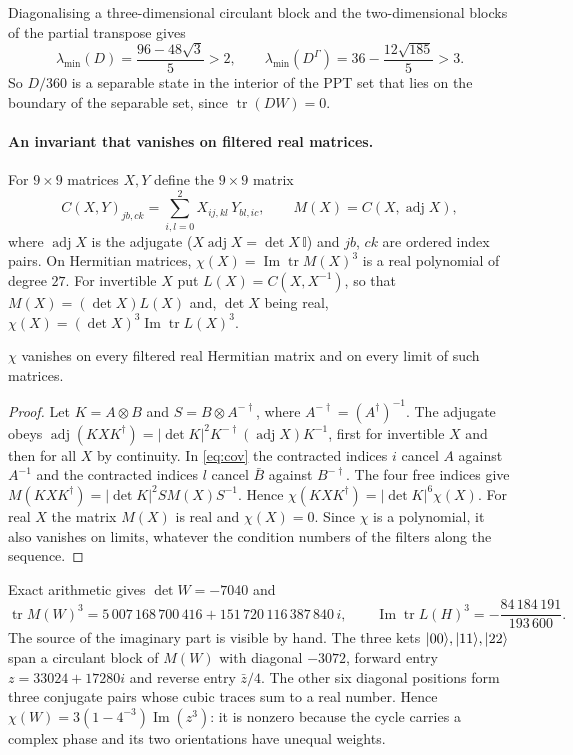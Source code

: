\documentclass[11pt,a4paper]{article}
\theoremstyle{definition}\newtheorem{definition}[theorem]{Definition}\newtheorem*{conj}{Conjecture 9 of Shen, Chen and Bian}\newtheorem{remark}[theorem]{Remark}
\newcommand{\tr}{\operatorname{tr}}\newcommand{\im}{\operatorname{Im}}\newcommand{\adj}{\operatorname{adj}}\newcommand{\id}{\mathbb I}
\begin{document}
Diagonalising a three-dimensional circulant block and the two-dimensional blocks of the partial transpose gives
\begin{equation}\label{eq:ranks}
 \lambda_{\min}(D)=\frac{96-48\sqrt3}{5}>2,\qquad
 \lambda_{\min}(D^\Gamma)=36-\frac{12\sqrt{185}}5>3 .
\end{equation}
So $D/360$ is a separable state in the interior of the PPT set that lies on the boundary of the separable set, since $\tr(DW)=0$.

\paragraph{An invariant that vanishes on filtered real matrices.}
For $9\times9$ matrices $X,Y$ define the $9\times9$ matrix
\begin{equation}\label{eq:cov}
 C(X,Y)_{jb,ck}=\sum_{i,l=0}^2 X_{ij,kl}\,Y_{bl,ic},\qquad
 M(X)= C(X,\adj X),
\end{equation}
where $\adj X$ is the adjugate ($X\adj X=\det X\,\id$) and $jb$, $ck$ are ordered index pairs. On Hermitian matrices, $\chi(X)=\im\tr M(X)^3$ is a real polynomial of degree $27$. For invertible $X$ put $L(X)=C(X,X^{-1})$, so that $M(X)=(\det X)L(X)$ and, $\det X$ being real, $\chi(X)=(\det X)^3\im\tr L(X)^3$.

\begin{lemma}\label{lem:cov}
$\chi$ vanishes on every filtered real Hermitian matrix and on every limit of such matrices.
\end{lemma}
\begin{proof}
Let $K=A\otimes B$ and $S=B\otimes A^{-\dagger}$, where $A^{-\dagger}=(A^\dagger)^{-1}$. The adjugate obeys
$\adj(KXK^\dagger)=|\det K|^2 K^{-\dagger}(\adj X)K^{-1}$, first for invertible $X$ and then for all $X$ by continuity. In \eqref{eq:cov} the contracted indices $i$ cancel $A$ against $A^{-1}$ and the contracted indices $l$ cancel $\bar B$ against $B^{-\dagger}$. The four free indices give
$M(KXK^\dagger)=|\det K|^2 S M(X) S^{-1}$.
Hence $\chi(KXK^\dagger)=|\det K|^6\chi(X)$. For real $X$ the matrix $M(X)$ is real and $\chi(X)=0$. Since $\chi$ is a polynomial, it also vanishes on limits, whatever the condition numbers of the filters along the sequence.
\end{proof}
Exact arithmetic gives $\det W=-7040$ and
\begin{equation}\label{eq:chi}
 \tr M(W)^3=5\,007\,168\,700\,416+151\,720\,116\,387\,840\,i,\qquad
 \im\tr L(H)^3=-\frac{84\,184\,191}{193\,600}.
\end{equation}
The source of the imaginary part is visible by hand. The three kets $\lvert 00\rangle,\lvert 11\rangle,\lvert 22\rangle$ span a circulant block of $M(W)$ with diagonal $-3072$, forward entry $z=33024+17280i$ and reverse entry $\bar z/4$. The other six diagonal positions form three conjugate pairs whose cubic traces sum to a real number. Hence $\chi(W)=3(1-4^{-3})\im(z^3)$: it is nonzero because the cycle carries a complex phase and its two orientations have unequal weights.
\end{document}

